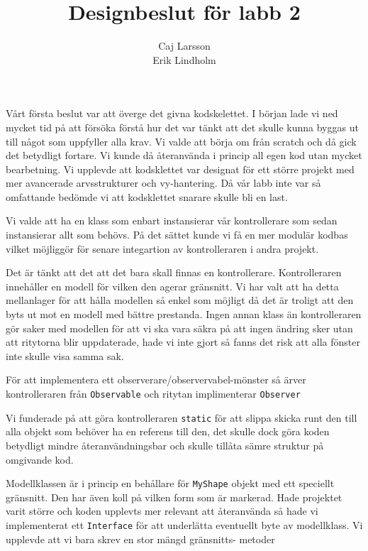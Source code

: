 \documentclass[a4paper,8pt]{article}
\begin{document}
\title{Designbeslut för labb 2}
\author{Caj Larsson\\Erik Lindholm}\maketitle

Vårt första beslut var att överge det givna kodskelettet. I början lade vi ned
mycket tid på att försöka förstå hur det var tänkt att det skulle kunna byggas
ut till något som uppfyller alla krav. Vi valde att börja om från scratch och då
gick det betydligt fortare. Vi kunde då återanvända i princip all egen kod 
utan mycket bearbetning. Vi upplevde att kodsklettet  var designat för ett 
större projekt med mer avancerade arvsstrukturer och vy-hantering. Då vår labb 
inte var så omfattande bedömde vi att kodsklettet snarare skulle bli en last.

Vi valde att ha en klass som enbart instansierar vår kontrollerare som sedan
instansierar allt som behövs. På det sättet kunde vi få en mer modulär kodbas
vilket möjliggör för senare integartion av kontrolleraren i andra projekt.

Det är tänkt att det att det bara skall finnas en kontrollerare. Kontrolleraren
innehåller en modell för vilken den agerar gränsnitt. Vi har valt att ha detta
mellanlager för att hålla modellen så enkel som möjligt då det är troligt att den
byts ut mot en modell med bättre prestanda. Ingen annan klass än kontrolleraren
gör saker med modellen för att vi ska vara säkra på att ingen ändring sker utan
att ritytorna blir uppdaterade, hade vi inte gjort så fanns det risk att alla
fönster inte skulle visa samma sak. 

För att implementera ett observerare/observervabel-mönster så ärver kontrolleraren
från \texttt{Observable} och ritytan implimenterar \texttt{Observer}

Vi funderade på att göra kontrolleraren \texttt{static} för att slippa skicka
runt den till alla objekt som behöver ha en referens till den, det skulle dock
göra koden betydligt mindre återanvändningsbar och skulle tillåta sämre struktur
på omgivande kod.

Modellklassen är i princip en behållare för \texttt{MyShape} objekt med ett
speciellt gränsnitt. Den har även koll på vilken form som är markerad. Hade 
projektet varit större och koden upplevts mer relevant att återanvända så
hade vi implementerat ett \texttt{Interface} för att underlätta eventuellt
byte av modellklass. Vi upplevde att vi bara skrev en stor mängd gränsnitts- 
metoder
\end{document}
